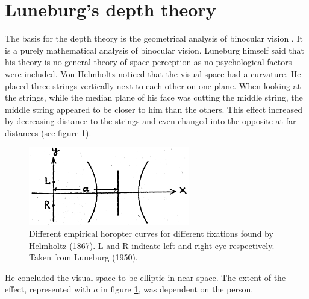 \section{Luneburg's depth theory}
The basis for the depth theory is the geometrical analysis of binocular vision \cite{Helmholtz.1867, Luneburg.1947}. It is a purely mathematical analysis of binocular vision. Luneburg \citeyear{Luneburg.1950} himself said that his theory is no general theory of space perception as no psychological factors were included.
Von Helmholtz \citeyear{Helmholtz.1867} noticed that the visual space had a curvature. He placed 
three strings vertically next to each other on one plane. When looking at the strings, while the median plane of his face was cutting the middle string, the middle string appeared to be closer to him than the others. This effect increased by decreasing distance to the strings and even changed into the opposite at far distances (see figure \ref{empHoropterHelmholtz}). 
\begin{figure}
    \centering
    \includegraphics[width=7cm]{Images/HelmholtzEmpHoropter.png}%
    \caption{Different empirical horopter curves for different fixations found by Helmholtz (1867). L and R indicate left and right eye respectively. Taken from Luneburg (1950).} %
    \label{empHoropterHelmholtz}
\end{figure}
He concluded the visual space to be elliptic in near space. The extent of the effect, represented with $a$ in figure \ref{empHoropterHelmholtz}, was dependent on the person.


